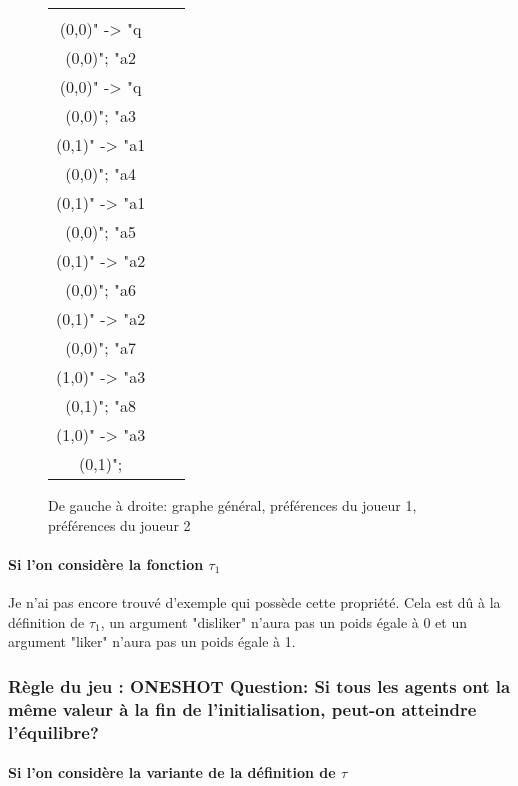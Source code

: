 \documentclass[12pt]{article}
\theoremstyle{defi}
\theoremstyle{not}
\theoremstyle{prob}
\begin{document}
\begin{figure}
\begin{tabular}{ccc}
              \begin{tikzpicture}[>=stealth]
              \graph [ layered layout, nodes = {scale=0.75, align=center} ] {
              "a1\\ (0,0)" -> "q\\ (0,0)";
              "a2\\ (0,0)" -> "q\\ (0,0)";
              "a3\\ (0,1)" -> "a1\\ (0,0)";
              "a4\\ (0,1)" -> "a1\\ (0,0)";
              "a5\\ (0,1)" -> "a2\\ (0,0)";
              "a6\\ (0,1)" -> "a2\\ (0,0)";
              "a7\\ (1,0)" -> "a3\\ (0,1)";
              "a8\\ (1,0)" -> "a3\\ (0,1)";
              };
              \end{tikzpicture} \\
            \end{tabular}

            \caption{De gauche à droite: graphe général, préférences du joueur 1, préférences du joueur 2}
            \label{fig:dif_pref}
          \end{figure}

        \paragraph{Si l'on considère la fonction $\tau_1$\\}
          Je n'ai pas encore trouvé d'exemple qui possède cette propriété.
          Cela est dû à la définition de $\tau_1$, un argument "disliker" n'aura pas un poids égale à 0 et un argument "liker" n'aura pas un poids égale à 1.


      \subsubsection{Règle du jeu : ONESHOT Question: Si tous les agents ont la même valeur à la fin de l'initialisation, peut-on atteindre l'équilibre?}

        \paragraph{Si l'on considère la variante de la définition de $\tau$\\}
\end{document}
